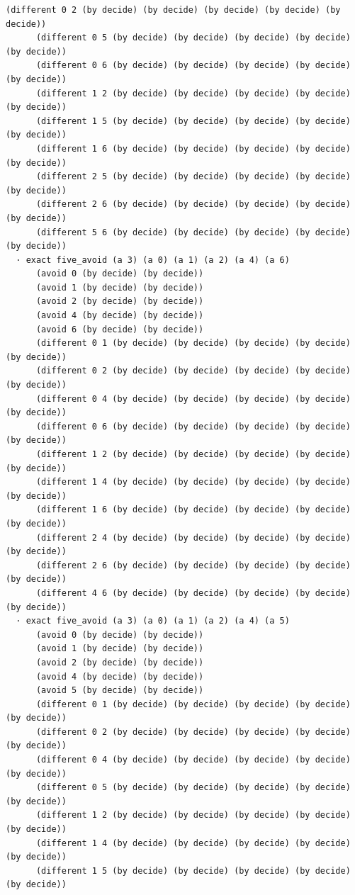 \documentclass[11pt,a4paper]{article}
\begin{document}
\begin{Verbatim}[breaklines,breakanywhere,fontsize=\footnotesize]
      (different 0 2 (by decide) (by decide) (by decide) (by decide) (by decide))
      (different 0 5 (by decide) (by decide) (by decide) (by decide) (by decide))
      (different 0 6 (by decide) (by decide) (by decide) (by decide) (by decide))
      (different 1 2 (by decide) (by decide) (by decide) (by decide) (by decide))
      (different 1 5 (by decide) (by decide) (by decide) (by decide) (by decide))
      (different 1 6 (by decide) (by decide) (by decide) (by decide) (by decide))
      (different 2 5 (by decide) (by decide) (by decide) (by decide) (by decide))
      (different 2 6 (by decide) (by decide) (by decide) (by decide) (by decide))
      (different 5 6 (by decide) (by decide) (by decide) (by decide) (by decide))
  · exact five_avoid (a 3) (a 0) (a 1) (a 2) (a 4) (a 6)
      (avoid 0 (by decide) (by decide))
      (avoid 1 (by decide) (by decide))
      (avoid 2 (by decide) (by decide))
      (avoid 4 (by decide) (by decide))
      (avoid 6 (by decide) (by decide))
      (different 0 1 (by decide) (by decide) (by decide) (by decide) (by decide))
      (different 0 2 (by decide) (by decide) (by decide) (by decide) (by decide))
      (different 0 4 (by decide) (by decide) (by decide) (by decide) (by decide))
      (different 0 6 (by decide) (by decide) (by decide) (by decide) (by decide))
      (different 1 2 (by decide) (by decide) (by decide) (by decide) (by decide))
      (different 1 4 (by decide) (by decide) (by decide) (by decide) (by decide))
      (different 1 6 (by decide) (by decide) (by decide) (by decide) (by decide))
      (different 2 4 (by decide) (by decide) (by decide) (by decide) (by decide))
      (different 2 6 (by decide) (by decide) (by decide) (by decide) (by decide))
      (different 4 6 (by decide) (by decide) (by decide) (by decide) (by decide))
  · exact five_avoid (a 3) (a 0) (a 1) (a 2) (a 4) (a 5)
      (avoid 0 (by decide) (by decide))
      (avoid 1 (by decide) (by decide))
      (avoid 2 (by decide) (by decide))
      (avoid 4 (by decide) (by decide))
      (avoid 5 (by decide) (by decide))
      (different 0 1 (by decide) (by decide) (by decide) (by decide) (by decide))
      (different 0 2 (by decide) (by decide) (by decide) (by decide) (by decide))
      (different 0 4 (by decide) (by decide) (by decide) (by decide) (by decide))
      (different 0 5 (by decide) (by decide) (by decide) (by decide) (by decide))
      (different 1 2 (by decide) (by decide) (by decide) (by decide) (by decide))
      (different 1 4 (by decide) (by decide) (by decide) (by decide) (by decide))
      (different 1 5 (by decide) (by decide) (by decide) (by decide) (by decide))

\end{Verbatim}
\end{document}
